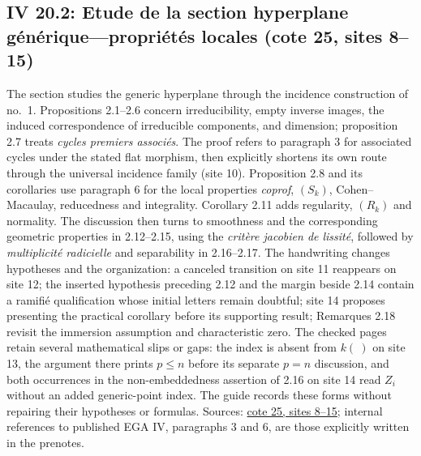 \documentclass[10pt,a4paper]{article}
\begin{document}
\subsection*{IV 20.2: Etude de la section hyperplane générique---propriétés locales (cote 25, sites 8--15)}
The section studies the generic hyperplane through the incidence construction of no.\ 1. Propositions 2.1--2.6 concern irreducibility, empty inverse images, the induced correspondence of irreducible components, and dimension; proposition 2.7 treats \emph{cycles premiers associés}. The proof refers to paragraph 3 for associated cycles under the stated flat morphism, then explicitly shortens its own route through the universal incidence family (site 10). Proposition 2.8 and its corollaries use paragraph 6 for the local properties \emph{coprof}, $(S_k)$, Cohen--Macaulay, reducedness and integrality. Corollary 2.11 adds regularity, $(R_k)$ and normality. The discussion then turns to smoothness and the corresponding geometric properties in 2.12--2.15, using the \emph{critère jacobien de lissité}, followed by \emph{multiplicité radicielle} and separability in 2.16--2.17. The handwriting changes hypotheses and the organization: a canceled transition on site 11 reappears on site 12; the inserted hypothesis preceding 2.12 and the margin beside 2.14 contain a ramifié qualification whose initial letters remain doubtful; site 14 proposes presenting the practical corollary before its supporting result; Remarques 2.18 revisit the immersion assumption and characteristic zero. The checked pages retain several mathematical slips or gaps: the index is absent from $k(\ )$ on site 13, the argument there prints $p\leq n$ before its separate $p=n$ discussion, and both occurrences in the non-embeddedness assertion of 2.16 on site 14 read $Z_i$ without an added generic-point index. The guide records these forms without repairing their hypotheses or formulas. Sources: \href{https://grothendieck.umontpellier.fr/web/viewer.html?file=../25.pdf\#page=9}{cote 25, sites 8--15}; internal references to published EGA IV, paragraphs 3 and 6, are those explicitly written in the prenotes.
\par{}

\par{}
\end{document}
